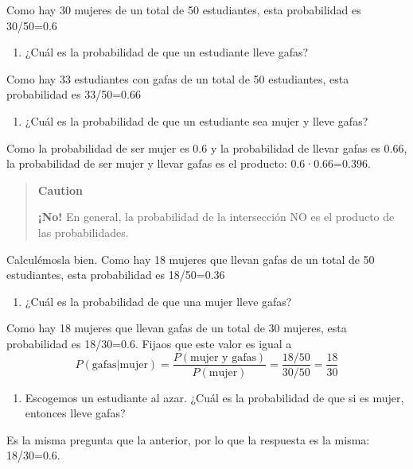 \documentclass[
  spanish,
  letterpaper,
  DIV=11,
  numbers=noendperiod]{scrreprt}
\providecommand{\tightlist}{%
  \setlength{\itemsep}{0pt}\setlength{\parskip}{0pt}}
\begin{document}
\begin{tcolorbox}
Como hay 30 mujeres de un total de 50 estudiantes, esta probabilidad es
30/50=0.6

\begin{enumerate}
\def\labelenumi{\arabic{enumi}.}
\setcounter{enumi}{1}
\tightlist
\item
  ¿Cuál es la probabilidad de que un estudiante lleve gafas?
\end{enumerate}

Como hay 33 estudiantes con gafas de un total de 50 estudiantes, esta
probabilidad es 33/50=0.66

\begin{enumerate}
\def\labelenumi{\arabic{enumi}.}
\setcounter{enumi}{2}
\tightlist
\item
  ¿Cuál es la probabilidad de que un estudiante sea mujer y lleve gafas?
\end{enumerate}

Como la probabilidad de ser mujer es 0.6 y la probabilidad de llevar
gafas es 0.66, la probabilidad de ser mujer y llevar gafas es el
producto: 0.6·0.66=0.396.

\begin{quote}
\textbf{Caution}

\textbf{¡No!} En general, la probabilidad de la intersección NO es el
producto de las probabilidades.
\end{quote}

Calculémosla bien. Como hay 18 mujeres que llevan gafas de un total de
50 estudiantes, esta probabilidad es 18/50=0.36

\begin{enumerate}
\def\labelenumi{\arabic{enumi}.}
\setcounter{enumi}{3}
\tightlist
\item
  ¿Cuál es la probabilidad de que una mujer lleve gafas?
\end{enumerate}

Como hay 18 mujeres que llevan gafas de un total de 30 mujeres, esta
probabilidad es 18/30=0.6. Fijaos que este valor es igual a \[
P(\text{gafas}|\text{mujer})=\frac{P(\text{mujer y gafas})}{P(\text{mujer})}=\frac{18/50}{30/50}=\frac{18}{30}
\]

\begin{enumerate}
\def\labelenumi{\arabic{enumi}.}
\setcounter{enumi}{4}
\tightlist
\item
  Escogemos un estudiante al azar. ¿Cuál es la probabilidad de que si es
  mujer, entonces lleve gafas?
\end{enumerate}

Es la misma pregunta que la anterior, por lo que la respuesta es la
misma: 18/30=0.6.


\end{tcolorbox}
\end{document}
